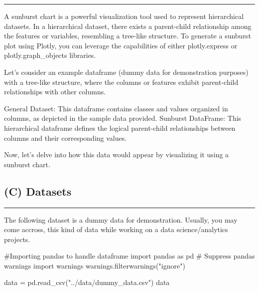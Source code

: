 \documentclass[
  letterpaper,
  DIV=11,
  numbers=noendperiod]{scrartcl}
\newenvironment{Shaded}{\begin{snugshade}}{\end{snugshade}}
\newcommand{\CommentTok}[1]{\textcolor[rgb]{0.37,0.37,0.37}{#1}}
\newcommand{\ImportTok}[1]{\textcolor[rgb]{0.00,0.46,0.62}{#1}}
\newcommand{\NormalTok}[1]{\textcolor[rgb]{0.00,0.23,0.31}{#1}}
\newcommand{\OperatorTok}[1]{\textcolor[rgb]{0.37,0.37,0.37}{#1}}
\newcommand{\StringTok}[1]{\textcolor[rgb]{0.13,0.47,0.30}{#1}}
\begin{document}
\begin{center}\rule{0.5\linewidth}{0.5pt}\end{center}

A sunburst chart is a powerful visualization tool used to represent
hierarchical datasets. In a hierarchical dataset, there exists a
parent-child relationship among the features or variables, resembling a
tree-like structure. To generate a sunburst plot using Plotly, you can
leverage the capabilities of either plotly.express or
plotly.graph\_objects libraries.

Let's consider an example dataframe (dummy data for demonstration
purposes) with a tree-like structure, where the columns or features
exhibit parent-child relationships with other columns.

General Dataset: This dataframe contains classes and values organized in
columns, as depicted in the sample data provided. Sunburst DataFrame:
This hierarchical dataframe defines the logical parent-child
relationships between columns and their corresponding values.

Now, let's delve into how this data would appear by visualizing it using
a sunburst chart.

\hypertarget{c-datasets}{%
\subsection{(C) Datasets}\label{c-datasets}}

\begin{center}\rule{0.5\linewidth}{0.5pt}\end{center}

The following dataset is a dummy data for demonstration. Usually, you
may come accross, this kind of data while working on a data
science/analytics projects.

\begin{Shaded}
\begin{Highlighting}[]
\CommentTok{\#Importing pandas to handle dataframe}
\ImportTok{import}\NormalTok{ pandas }\ImportTok{as}\NormalTok{ pd}
\CommentTok{\# Suppress pandas warnings}
\ImportTok{import}\NormalTok{ warnings}
\NormalTok{warnings.filterwarnings(}\StringTok{"ignore"}\NormalTok{)}

\NormalTok{data }\OperatorTok{=}\NormalTok{ pd.read\_csv(}\StringTok{"../data/dummy\_data.csv"}\NormalTok{)}
\NormalTok{data}
\end{Highlighting}
\end{Shaded}
\end{document}
